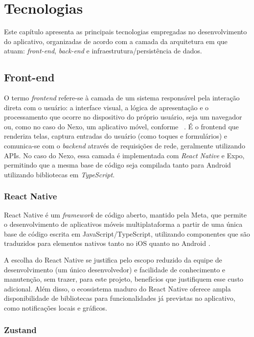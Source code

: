 \chapter{Tecnologias}

Este capítulo apresenta as principais tecnologias empregadas no desenvolvimento
do aplicativo, organizadas de acordo com a camada da arquitetura em que atuam:
\textit{front-end}, \textit{back-end} e infraestrutura/persistência de dados.

\section{Front-end}

O termo \textit{frontend} refere-se à camada de um sistema responsável pela
interação direta com o usuário: a interface visual, a lógica de apresentação e
o processamento que ocorre no dispositivo do próprio usuário, seja um navegador
ou, como no caso do Nexo, um aplicativo móvel, conforme
~\citet{sommerville:2010}. É o frontend que renderiza telas, captura entradas
do usuário (como toques e formulários) e comunica-se com o \textit{backend}
através de requisições de rede, geralmente utilizando APIs. No caso do Nexo,
essa camada é implementada com \textit{React Native} e Expo, permitindo que a
mesma base de código seja compilada tanto para Android utilizando bibliotecas
em \textit{TypeScript}.

\subsection{React Native}

React Native é um \textit{framework} de código aberto, mantido pela Meta, que
permite o desenvolvimento de aplicativos móveis multiplataforma a partir de
uma única base de código escrita em JavaScript/TypeScript, utilizando
componentes que são traduzidos para elementos nativos tanto no iOS quanto no
Android \citep{reactnative:2026}.

A escolha do React Native se justifica pelo escopo reduzido da equipe de
desenvolvimento (um único desenvolvedor) e facilidade de conhecimento e
manutenção, sem trazer, para este projeto, benefícios que justifiquem esse
custo adicional. Além disso, o ecossistema maduro do React Native oferece
ampla disponibilidade de bibliotecas para funcionalidades já previstas no
aplicativo, como notificações locais e gráficos.

\subsection{Zustand}

